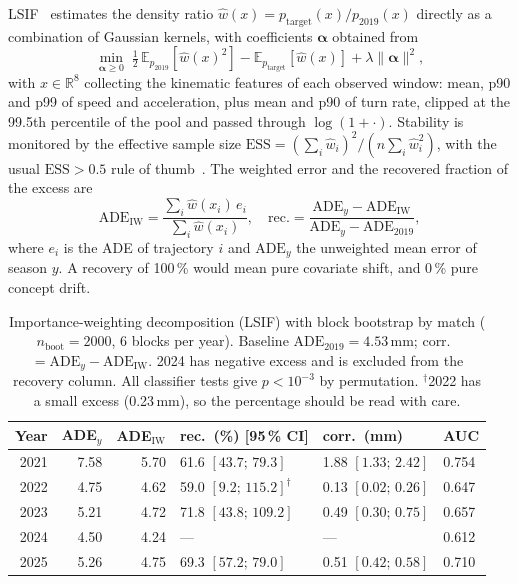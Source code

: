 \documentclass[conference]{IEEEtran}
\begin{document}
LSIF~\cite{kliep,kanamori2009,sugiyama_book} estimates the density ratio
$\hat{w}(x) = p_{\text{target}}(x)/p_{2019}(x)$ directly as a combination of
Gaussian kernels, with coefficients $\boldsymbol\alpha$ obtained from
\begin{equation}\label{eq:lsif}
\min_{\boldsymbol\alpha \geq 0}\;
\tfrac{1}{2}\,\mathbb{E}_{p_{2019}}[\hat{w}(x)^2] -
\mathbb{E}_{p_{\text{target}}}[\hat{w}(x)] + \lambda\|\boldsymbol\alpha\|^2 ,
\end{equation}
with $x \in \mathbb{R}^{8}$ collecting the kinematic features of each observed
window: mean, p90 and p99 of speed and acceleration, plus mean and p90 of turn
rate, clipped at the 99.5th percentile of the pool and passed through
$\log(1+\cdot)$. Stability is monitored by the effective sample size
$\mathrm{ESS} = (\sum_i \hat{w}_i)^2/(n\sum_i \hat{w}_i^2)$, with the usual
$\mathrm{ESS} > 0.5$ rule of thumb~\cite{sugiyama_book}. The weighted error and
the recovered fraction of the excess are
\begin{equation}\label{eq:recovery}
\mathrm{ADE}_{\mathrm{IW}} = \frac{\sum_i \hat{w}(x_i)\,e_i}{\sum_i \hat{w}(x_i)},
\quad
\mathrm{rec.} = \frac{\mathrm{ADE}_y - \mathrm{ADE}_{\mathrm{IW}}}
                     {\mathrm{ADE}_y - \mathrm{ADE}_{2019}} ,
\end{equation}
where $e_i$ is the ADE of trajectory $i$ and $\mathrm{ADE}_y$ the
unweighted mean error of season $y$.
A recovery of 100\,\% would mean pure covariate shift, and 0\,\% pure concept
drift.

\begin{table}[!t]
\centering
\caption{Importance-weighting decomposition (LSIF) with block bootstrap by
match ($n_{\text{boot}} = 2000$, 6 blocks per year). Baseline
$\mathrm{ADE}_{2019} = 4.53$\,mm; corr.\ $= \mathrm{ADE}_y -
\mathrm{ADE}_{\mathrm{IW}}$. 2024 has negative excess and is excluded from the
recovery column. All classifier tests give $p < 10^{-3}$ by permutation.
$^{\dagger}$2022 has a small excess (0.23\,mm), so the percentage should be
read with care.}
\label{tab:iw}
\footnotesize
\setlength{\tabcolsep}{3pt}
\begin{tabular}{@{}rrrlll@{}}
\toprule
\textbf{Year} & \textbf{ADE$_y$} & \textbf{ADE$_{\mathrm{IW}}$}
 & \textbf{rec.\ (\%) [95\,\% CI]} & \textbf{corr.\ (mm)} & \textbf{AUC} \\
\midrule
2021 & 7.58 & 5.70 & 61.6 $[43.7;\,79.3]$          & 1.88 $[1.33;\,2.42]$ & 0.754 \\
2022 & 4.75 & 4.62 & 59.0 $[9.2;\,115.2]^{\dagger}$ & 0.13 $[0.02;\,0.26]$ & 0.647 \\
2023 & 5.21 & 4.72 & 71.8 $[43.8;\,109.2]$          & 0.49 $[0.30;\,0.75]$ & 0.657 \\
2024 & 4.50 & 4.24 & ---                            & ---                  & 0.612 \\
2025 & 5.26 & 4.75 & 69.3 $[57.2;\,79.0]$           & 0.51 $[0.42;\,0.58]$ & 0.710 \\
\bottomrule
\end{tabular}
\end{table}
\end{document}
